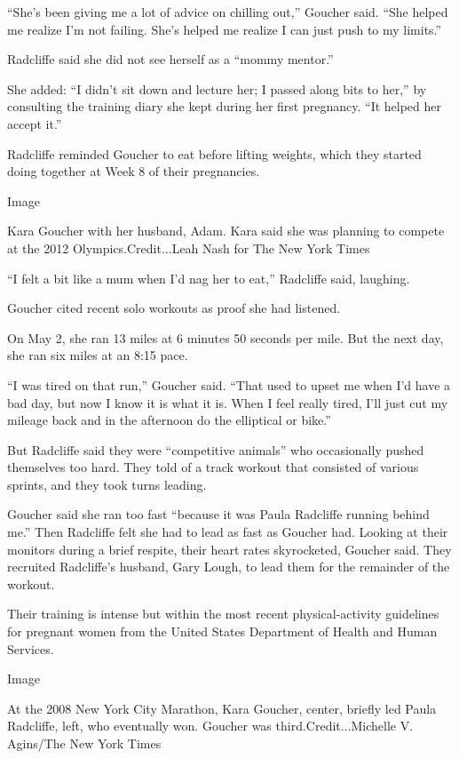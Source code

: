 ``She's been giving me a lot of advice on chilling out,'' Goucher said.
``She helped me realize I'm not failing. She's helped me realize I can
just push to my limits.''

Radcliffe said she did not see herself as a ``mommy mentor.''

She added: ``I didn't sit down and lecture her; I passed along bits to
her,'' by consulting the training diary she kept during her first
pregnancy. ``It helped her accept it.''

Radcliffe reminded Goucher to eat before lifting weights, which they
started doing together at Week 8 of their pregnancies.

Image

Kara Goucher with her husband, Adam. Kara said she was planning to
compete at the 2012 Olympics.Credit...Leah Nash for The New York Times

``I felt a bit like a mum when I'd nag her to eat,'' Radcliffe said,
laughing.

Goucher cited recent solo workouts as proof she had listened.

On May 2, she ran 13 miles at 6 minutes 50 seconds per mile. But the
next day, she ran six miles at an 8:15 pace.

``I was tired on that run,'' Goucher said. ``That used to upset me when
I'd have a bad day, but now I know it is what it is. When I feel really
tired, I'll just cut my mileage back and in the afternoon do the
elliptical or bike.''

But Radcliffe said they were ``competitive animals'' who occasionally
pushed themselves too hard. They told of a track workout that consisted
of various sprints, and they took turns leading.

Goucher said she ran too fast ``because it was Paula Radcliffe running
behind me.'' Then Radcliffe felt she had to lead as fast as Goucher had.
Looking at their monitors during a brief respite, their heart rates
skyrocketed, Goucher said. They recruited Radcliffe's husband, Gary
Lough, to lead them for the remainder of the workout.

Their training is intense but within the most recent physical-activity
guidelines for pregnant women from the United States Department of
Health and Human Services.

Image

At the 2008 New York City Marathon, Kara Goucher, center, briefly led
Paula Radcliffe, left, who eventually won. Goucher was
third.Credit...Michelle V. Agins/The New York Times

